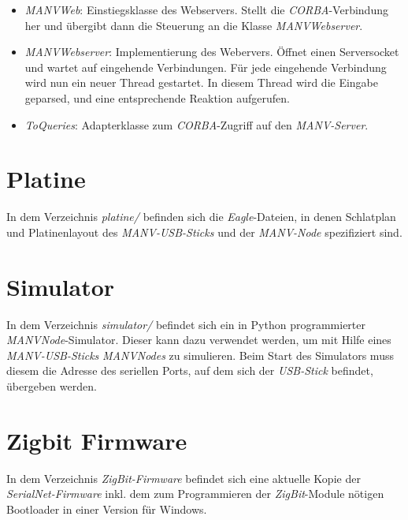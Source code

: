     \begin{itemize}
        \item{\emph{MANVWeb}:} Einstiegsklasse des Webservers. Stellt die \emph{CORBA}-Verbindung her
                        und übergibt dann die Steuerung an die Klasse \emph{MANVWebserver}.
        \item{\emph{MANVWebserver}:} Implementierung des Webervers. Öffnet einen Serversocket und
                              wartet auf eingehende Verbindungen. Für jede eingehende Verbindung
                              wird nun ein neuer Thread gestartet. In diesem Thread
                              wird die Eingabe geparsed, und eine entsprechende Reaktion
                              aufgerufen. 
        \item{\emph{ToQueries}:} Adapterklasse zum \emph{CORBA}-Zugriff auf den \emph{MANV-Server}. 
    \end{itemize}

    \section{Platine}

    In dem Verzeichnis \emph{platine/} befinden sich die \emph{Eagle}-Dateien, in 
    denen Schlatplan und Platinenlayout des \emph{MANV-USB-Sticks} und der
    \emph{MANV-Node} spezifiziert sind.

    \section{Simulator}

    In dem Verzeichnis \emph{simulator/} befindet sich ein in Python programmierter
    \emph{MANVNode}-Simulator. Dieser kann dazu verwendet werden, um mit Hilfe
    eines \emph{MANV-USB-Sticks} \emph{MANVNodes} zu simulieren. Beim Start des
    Simulators muss diesem die Adresse des seriellen Ports, auf dem sich der
    \emph{USB-Stick} befindet, übergeben werden.

    \section{Zigbit Firmware}
    In dem Verzeichnis \emph{ZigBit-Firmware} befindet sich eine aktuelle Kopie der
    \emph{SerialNet-Firmware} inkl. dem zum Programmieren der \emph{ZigBit}-Module
    nötigen Bootloader in einer Version für Windows.
